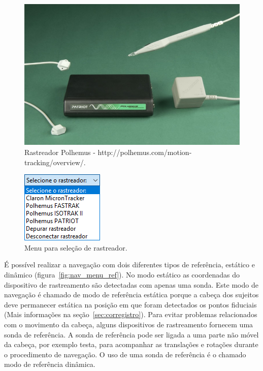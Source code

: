 \begin{figure}[!htb]
\centering
\includegraphics[scale=0.5]{../user_guide_figures/tracker_polhemus.jpg}
\caption{Rastreador Polhemus - http://polhemus.com/motion-tracking/overview/.}
\label{fig:tracker_polhemus}
\end{figure}

\begin{figure}[!htb]
\centering
\includegraphics[scale=0.5]{../user_guide_figures/invesalius_screen/nav_select_tracker_pt.png}
\caption{Menu para seleção de rastreador.}
\label{fig:nav_select_tracker}
\end{figure}

É possível realizar a navegação com dois diferentes tipos de referência, estático e dinâmico (figura~\ref{fig:nav_menu_ref}). No modo estático as coordenadas do dispositivo de rastreamento são detectadas com apenas uma sonda. Este modo de navegação é chamado de modo de referência estática porque a cabeça dos sujeitos deve permanecer estática na posição em que foram detectados os pontos fiduciais (Mais informações na seção~\ref{sec:corregistro}).
Para evitar problemas relacionados com o movimento da cabeça, alguns dispositivos de rastreamento fornecem uma sonda de referência. A sonda de referência pode ser ligada a uma parte não móvel da cabeça, por exemplo testa, para acompanhar as translações e rotações durante o procedimento de navegação. O uso de uma sonda de referência é o chamado modo de referência dinâmica.

